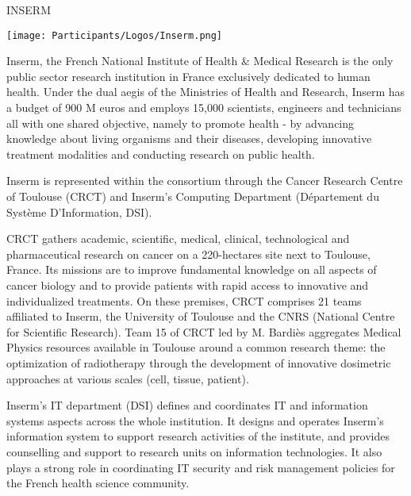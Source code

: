 \begin{sitedescription}{INSERM}

\begin{center}
\texttt{[image: Participants/Logos/Inserm.png]}
\end{center}

Inserm, the French National Institute of Health \& Medical Research is the only
public sector research institution in France exclusively dedicated to human
health. Under the dual aegis of the Ministries of Health and Research, Inserm
has a budget of 900 M euros and employs 15,000 scientists, engineers and
technicians all with one shared objective, namely to promote health - by
advancing knowledge about living organisms and their diseases, developing
innovative treatment modalities and conducting research on public health.

Inserm is represented within the \TheProject consortium through the Cancer Research
Centre of Toulouse (CRCT) and Inserm’s Computing Department (D\'epartement du
Système D’Information, DSI).

CRCT gathers academic, scientific, medical, clinical, technological and
pharmaceutical research on cancer on a 220-hectares site next to Toulouse,
France. Its missions are to improve fundamental knowledge on all aspects of
cancer biology and to provide patients with rapid access to innovative and
individualized treatments. On these premises, CRCT comprises 21 teams
affiliated to Inserm, the University of Toulouse and the CNRS (National Centre
for Scientific Research). Team 15 of CRCT led by M. Bardi\`es aggregates
Medical Physics resources available in Toulouse around a common research theme:
the optimization of radiotherapy through the development of innovative
dosimetric approaches at various scales (cell, tissue, patient).

Inserm's IT department (DSI) defines and coordinates IT and information systems
aspects across the whole institution. It designs and operates Inserm's
information system to support research activities of the institute, and
provides counselling and support to research units on information technologies.
It also plays a strong role in coordinating IT security and risk management
policies for the French health science community.

%


\end{sitedescription}
